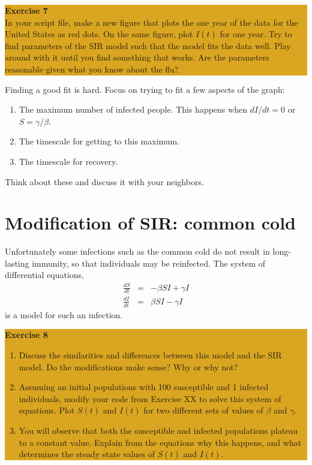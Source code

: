 \documentclass[12pt]{amsart}
\begin{document}
\begin{center}
\colorbox{Goldenrod}{\parbox{15cm}{
{
\textbf{\large Exercise 7}\vspace{1mm} \\
In your script file, make a new figure that plots the one year of the data for the United States as red dots.  On the same figure, plot $I(t)$ for one year.  Try to find parameters of the SIR model such that the model fits the data well.  Play around with it until you find something that works.  Are the parameters reasonable given what you know about the flu?
}}}
\end{center}
\vspace{.1in}

\noindent Finding a good fit is hard.  Focus on trying to fit a few aspects of the graph:
\begin{enumerate}
\item The maximum number of infected people.  This happens when $dI/dt = 0$ or $S = \gamma/\beta$.
\item The timescale for getting to this maximum.
\item The timescale for recovery.
\end{enumerate}


\noindent Think about these and discuss it with your neighbors.


\section{Modification of SIR: common cold}

\noindent Unfortunately some infections such as the common cold do not result in long-lasting immunity, so that individuals may be reinfected.  The system of differential equations,
\begin{eqnarray}
\frac{d S}{d t} &=& - \beta S I + \gamma I \nonumber \\
\frac{d I}{d t} &=&  \beta S I - \gamma I \nonumber 
\end{eqnarray}
is a model for such an infection.\\

\begin{center}
\colorbox{Goldenrod}{\parbox{15cm}{
{
\textbf{\large Exercise 8} \\
\begin{enumerate}
\item Discuss the similarities and differences between this model and the SIR model.  Do the modifications make sense?  Why or why not?
\item Assuming an initial populations with 100 susceptible and 1 infected individuals, modify your code from Exercise XX to  solve this system of equations.  Plot $S(t)$ and $I(t)$ for two different sets of values of $\beta$ and $\gamma$.
\item You will observe that both the susceptible and infected populations plateau to a constant value.  Explain from the equations why this happens, and what determines the steady state values of $S(t)$ and $I(t)$.
\end{enumerate}
}}}
\end{center}
\end{document}
